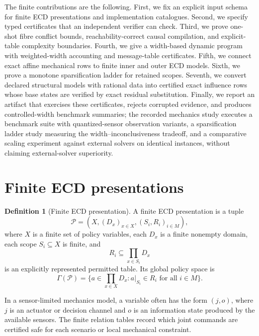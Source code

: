 \documentclass[11pt]{article}
\theoremstyle{plain}
\theoremstyle{definition}
\newtheorem{definition}[theorem]{Definition}
\theoremstyle{remark}
\begin{document}
The finite contributions are the following.  First, we fix an explicit input
schema for finite ECD presentations and implementation catalogues.  Second, we
specify typed certificates that an independent verifier can check.  Third, we
prove one-shot fibre conflict bounds, reachability-correct causal compilation,
and explicit-table complexity boundaries.  Fourth, we give a width-based dynamic
program with weighted-width accounting and message-table certificates.  Fifth,
we connect exact affine mechanical rows to finite inner and outer ECD models.
Sixth, we prove a monotone sparsification ladder for retained scopes.  Seventh,
we convert declared structural models with rational data into certified exact
influence rows whose base states are verified by exact residual substitution.
Finally, we report an artifact that exercises these certificates, rejects
corrupted evidence, and produces controlled-width benchmark summaries; the
recorded mechanics study executes a benchmark suite with quantized-sensor
observation variants, a sparsification ladder study measuring the
width--inconclusiveness tradeoff, and a comparative scaling experiment against
external solvers on identical instances, without claiming external-solver
superiority.

\section{Finite ECD presentations}
\label{sec:finite-presentations}

\begin{definition}[Finite ECD presentation]
A finite ECD presentation is a tuple
\[
  \mathcal P=(X,(D_x)_{x\in X},(S_i,R_i)_{i\in M}),
\]
where \(X\) is a finite set of policy variables, each \(D_x\) is a finite
nonempty domain, each scope \(S_i\subseteq X\) is finite, and
\[
  R_i\subseteq\prod_{x\in S_i}D_x
\]
is an explicitly represented permitted table.  Its global policy space is
\[
  \Gamma(\mathcal P)=
  \{a\in\prod_{x\in X}D_x: a|_{S_i}\in R_i\text{ for all }i\in M\}.
\]
\end{definition}

In a sensor-limited mechanics model, a variable often has the form \((j,o)\),
where \(j\) is an actuator or decision channel and \(o\) is an information state
produced by the available sensors.  The finite relation tables record which
joint commands are certified safe for each scenario or local mechanical
constraint.
\end{document}

